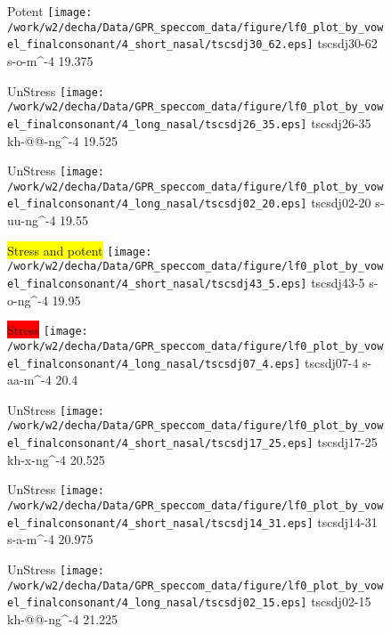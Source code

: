 \documentclass{article}
\begin{document}
\begin{figure}[t]
\begin{minipage}[b]{.24\textwidth}
\colorbox{Apricot}{Potent}
\centering
\texttt{[image: /work/w2/decha/Data/GPR\_speccom\_data/figure/lf0\_plot\_by\_vowel\_finalconsonant/4\_short\_nasal/tscsdj30\_62.eps]}
tscsdj30-62 s-o-m\textasciicircum-4 19.375
\end{minipage}
\begin{minipage}[b]{.24\textwidth}
UnStress
\centering
\texttt{[image: /work/w2/decha/Data/GPR\_speccom\_data/figure/lf0\_plot\_by\_vowel\_finalconsonant/4\_long\_nasal/tscsdj26\_35.eps]}
tscsdj26-35 kh-@@-ng\textasciicircum-4 19.525
\end{minipage}
\begin{minipage}[b]{.24\textwidth}
UnStress
\centering
\texttt{[image: /work/w2/decha/Data/GPR\_speccom\_data/figure/lf0\_plot\_by\_vowel\_finalconsonant/4\_long\_nasal/tscsdj02\_20.eps]}
tscsdj02-20 s-uu-ng\textasciicircum-4 19.55
\end{minipage}
\begin{minipage}[b]{.24\textwidth}
\colorbox{yellow}{Stress and potent}
\centering
\texttt{[image: /work/w2/decha/Data/GPR\_speccom\_data/figure/lf0\_plot\_by\_vowel\_finalconsonant/4\_short\_nasal/tscsdj43\_5.eps]}
tscsdj43-5 s-o-ng\textasciicircum-4 19.95
\end{minipage}
\end{figure}

\begin{figure}[t]
\begin{minipage}[b]{.24\textwidth}
\colorbox{red}{Stress}
\centering
\texttt{[image: /work/w2/decha/Data/GPR\_speccom\_data/figure/lf0\_plot\_by\_vowel\_finalconsonant/4\_long\_nasal/tscsdj07\_4.eps]}
tscsdj07-4 s-aa-m\textasciicircum-4 20.4
\end{minipage}
\begin{minipage}[b]{.24\textwidth}
UnStress
\centering
\texttt{[image: /work/w2/decha/Data/GPR\_speccom\_data/figure/lf0\_plot\_by\_vowel\_finalconsonant/4\_short\_nasal/tscsdj17\_25.eps]}
tscsdj17-25 kh-x-ng\textasciicircum-4 20.525
\end{minipage}
\begin{minipage}[b]{.24\textwidth}
UnStress
\centering
\texttt{[image: /work/w2/decha/Data/GPR\_speccom\_data/figure/lf0\_plot\_by\_vowel\_finalconsonant/4\_short\_nasal/tscsdj14\_31.eps]}
tscsdj14-31 s-a-m\textasciicircum-4 20.975
\end{minipage}
\begin{minipage}[b]{.24\textwidth}
UnStress
\centering
\texttt{[image: /work/w2/decha/Data/GPR\_speccom\_data/figure/lf0\_plot\_by\_vowel\_finalconsonant/4\_long\_nasal/tscsdj02\_15.eps]}
tscsdj02-15 kh-@@-ng\textasciicircum-4 21.225
\end{minipage}
\end{figure}
\end{document}
